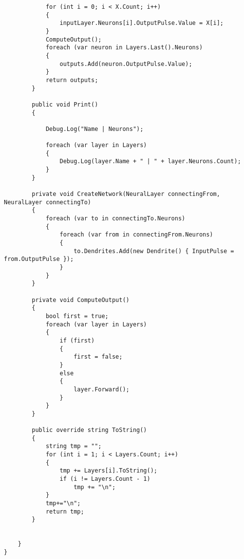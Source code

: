 \documentclass[12pt,a4paper]{article}
\begin{document}
\begin{lstlisting}
            for (int i = 0; i < X.Count; i++)
            {
                inputLayer.Neurons[i].OutputPulse.Value = X[i];
            }
            ComputeOutput();
            foreach (var neuron in Layers.Last().Neurons)
            {
                outputs.Add(neuron.OutputPulse.Value);
            }
            return outputs;
        }

        public void Print()
        {

            Debug.Log("Name | Neurons");

            foreach (var layer in Layers)
            {
                Debug.Log(layer.Name + " | " + layer.Neurons.Count);
            }
        }

        private void CreateNetwork(NeuralLayer connectingFrom, NeuralLayer connectingTo)
        {
            foreach (var to in connectingTo.Neurons)
            {
                foreach (var from in connectingFrom.Neurons)
                {
                    to.Dendrites.Add(new Dendrite() { InputPulse = from.OutputPulse });
                }
            }
        }

        private void ComputeOutput()
        {
            bool first = true;
            foreach (var layer in Layers)
            {
                if (first)
                {
                    first = false;
                }
                else
                {
                    layer.Forward();
                }
            }
        }

        public override string ToString()
        {
            string tmp = "";
            for (int i = 1; i < Layers.Count; i++)
            {
                tmp += Layers[i].ToString();
                if (i != Layers.Count - 1)
                    tmp += "\n";
            }
            tmp+="\n";
            return tmp;
        }
       

    }
}






\end{lstlisting}
\pagebreak
\end{document}

